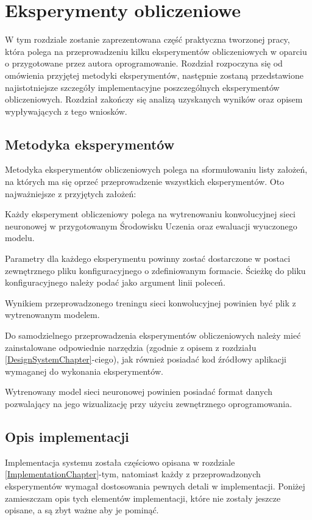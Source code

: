 \chapter{Eksperymenty obliczeniowe}
\label{ExperimentsChapter}
\vspace*{-1cm}
W tym rozdziale zostanie zaprezentowana część praktyczna tworzonej pracy, która polega na przeprowadzeniu kilku eksperymentów obliczeniowych w oparciu o przygotowane przez autora oprogramowanie. Rozdział rozpoczyna się od omówienia przyjętej metodyki eksperymentów, następnie zostaną przedstawione najistotniejsze szczegóły implementacyjne poszczególnych eksperymentów obliczeniowych. Rozdział zakończy się analizą uzyskanych wyników oraz opisem wypływających z tego wniosków.

\section{Metodyka eksperymentów}
Metodyka eksperymentów obliczeniowych polega na sformułowaniu listy założeń, na których ma się oprzeć przeprowadzenie wszystkich eksperymentów. Oto najważniejsze z przyjętych założeń:
\vspace*{-0.5cm}
\begin{enumerate*}
\item Każdy eksperyment obliczeniowy polega na wytrenowaniu konwolucyjnej sieci neuronowej w przygotowanym Środowisku Uczenia oraz ewaluacji wyuczonego modelu.
\item Parametry dla każdego eksperymentu powinny zostać dostarczone w postaci zewnętrznego pliku konfiguracyjnego o zdefiniowanym formacie. Ścieżkę do pliku konfiguracyjnego należy podać jako argument linii poleceń.
\item Wynikiem przeprowadzonego treningu sieci konwolucyjnej powinien być plik z wytrenowanym modelem.
\item Do samodzielnego przeprowadzenia eksperymentów obliczeniowych należy mieć zainstalowane odpowiednie narzędzia (zgodnie z opisem z rozdziału \ref{DesignSystemChapter}-ciego), jak również posiadać kod źródłowy aplikacji wymaganej do wykonania eksperymentów.
\item Wytrenowany model sieci neuronowej powinien posiadać format danych pozwalający na jego wizualizację przy użyciu zewnętrznego oprogramowania.
\end{enumerate*}

\section{Opis implementacji}
Implementacja systemu została częściowo opisana w rozdziale \ref{ImplementationChapter}-tym, natomiast każdy z przeprowadzonych eksperymentów wymagał dostosowania pewnych detali w implementacji. Poniżej zamieszczam opis tych elementów implementacji, które nie zostały jeszcze opisane, a są zbyt ważne aby je pominąć.

